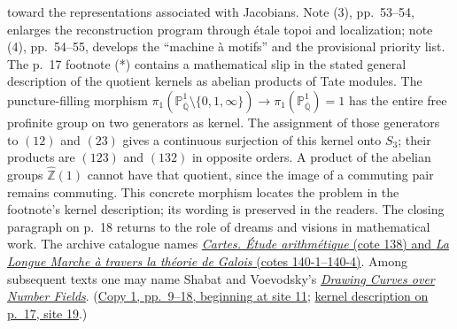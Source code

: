 \documentclass[11pt,a4paper]{article}
\begin{document}
toward the representations associated with Jacobians. Note (3),
pp.~53--54, enlarges the reconstruction program through étale topoi
and localization; note (4), pp.~54--55, develops the ``machine à motifs''
and the provisional priority list. The p.~17 footnote (*)
contains a mathematical slip in the stated general description of the
quotient kernels as abelian products of Tate modules. The puncture-filling
morphism
$\pi_1(\mathbb P^1_{\overline{\mathbb Q}}\setminus\{0,1,\infty\})
\longrightarrow\pi_1(\mathbb P^1_{\overline{\mathbb Q}})=1$
has the entire free profinite group on two generators as kernel. The
assignment of those generators to $(12)$ and $(23)$ gives a continuous
surjection of this kernel onto $S_3$; their products are $(123)$ and
$(132)$ in opposite orders. A product of the abelian groups
$\hat{\mathbb Z}(1)$ cannot have that quotient, since the image of a
commuting pair remains commuting. This concrete morphism locates the
problem in the footnote's kernel description; its wording is preserved
in the readers. The closing paragraph on p.~18 returns to the role of
dreams and visions in mathematical work. The archive catalogue names
\href{https://grothendieck.umontpellier.fr/archives-grothendieck/}{\emph{Cartes. Étude arithmétique} (cote 138) and \emph{La Longue Marche à travers la théorie de Galois} (cotes 140-1--140-4)}.
Among subsequent texts one may
name Shabat and Voevodsky's
\href{https://www.math.ias.edu/vladimir/node/79}{\emph{Drawing Curves over Number Fields}}.
(\href{https://grothendieck.umontpellier.fr/web/viewer.html?file=../119.pdf\#page=12}{Copy 1, pp.~9--18, beginning at site 11};
\href{https://grothendieck.umontpellier.fr/web/viewer.html?file=../119.pdf\#page=20}{kernel description on p.~17, site 19}.)
\end{document}
